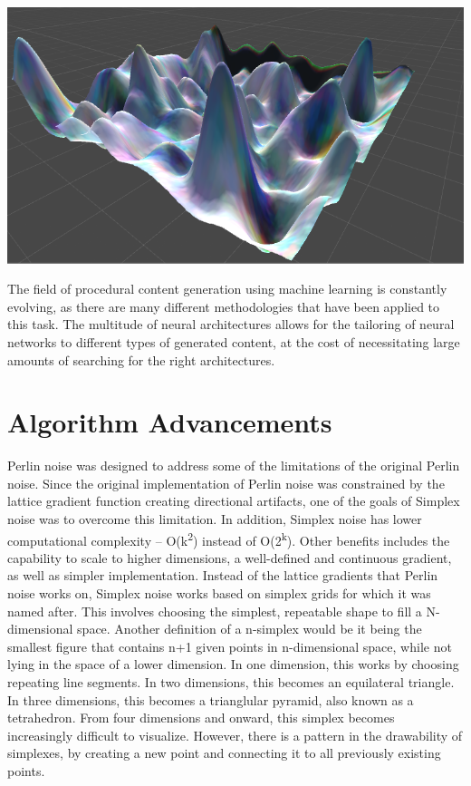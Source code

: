 \documentclass[10pt]{report}
\begin{document}
		\begin{minipage}{\textwidth}
			\centering
			\includegraphics[scale=.3]{rolling}
			\label{fig:dl-noise}
		\end{minipage}
	
		The field of procedural content generation using machine learning is constantly evolving, as there are many different methodologies that have been applied to this task. The multitude of neural architectures allows for the tailoring of neural networks to different types of generated content, at the cost of necessitating large amounts of searching for the right architectures.
		
		\cite{Liu_2020}
		
		\section{Algorithm Advancements}
		
		Perlin noise was designed to address some of the limitations of the original Perlin noise. Since the original implementation of Perlin noise was constrained by the lattice gradient function creating directional artifacts, one of the goals of Simplex noise was to overcome this limitation. In addition, Simplex noise has lower computational complexity -- O(k\textsuperscript{2}) instead of O(2\textsuperscript{k})\cite{sheet-simplex}. Other benefits includes the capability to scale to higher dimensions, a well-defined and continuous gradient, as well as simpler implementation. Instead of the lattice gradients that Perlin noise works on, Simplex noise works based on simplex grids for which it was named after. This involves choosing the simplest, repeatable shape to fill a N-dimensional space. Another definition of a n-simplex would be it being the smallest figure that contains n+1 given points in n-dimensional space, while not lying in the space of a lower dimension. In one dimension, this works by choosing repeating line segments. In two dimensions, this becomes an equilateral triangle. In three dimensions, this becomes a trianglular pyramid, also known as a tetrahedron. From four dimensions and onward, this simplex becomes increasingly difficult to visualize. However, there is a pattern in the drawability of simplexes, by creating a new point and connecting it to all previously existing points.
		
\end{document}
